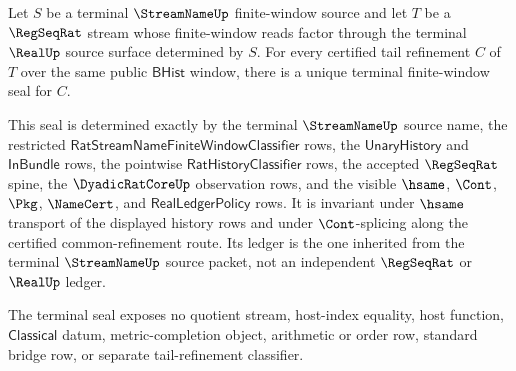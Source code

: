 \begin{theorem}
\label{thm:regseqrat-terminal-tail-refinement-seal}
Let $S$ be a terminal $\StreamNameUp$ finite-window source and let $T$ be a
$\RegSeqRat$ stream whose finite-window reads factor through the terminal
$\RealUp$ source surface determined by $S$. For every certified tail
refinement $C$ of $T$ over the same public $\mathsf{BHist}$ window, there is a
unique terminal finite-window seal for $C$.

This seal is determined exactly by the terminal $\StreamNameUp$ source name,
the restricted $\mathsf{RatStreamNameFiniteWindowClassifier}$ rows, the
$\mathsf{UnaryHistory}$ and $\mathsf{InBundle}$ rows, the pointwise
$\mathsf{RatHistoryClassifier}$ rows, the accepted $\RegSeqRat$ spine, the
$\DyadicRatCoreUp$ observation rows, and the visible $\hsame$, $\Cont$,
$\Pkg$, $\NameCert$, and $\mathsf{RealLedgerPolicy}$ rows. It is invariant
under $\hsame$ transport of the displayed history rows and under
$\Cont$-splicing along the certified common-refinement route. Its ledger is the
one inherited from the terminal $\StreamNameUp$ source packet, not an
independent $\RegSeqRat$ or $\RealUp$ ledger.

The terminal seal exposes no quotient stream, host-index equality, host
function, $\mathsf{Classical}$ datum, metric-completion object, arithmetic or
order row, standard bridge row, or separate tail-refinement classifier.
\end{theorem}
